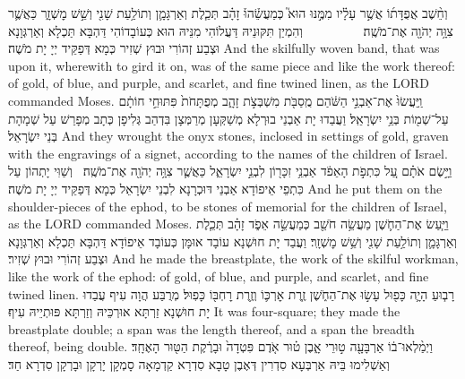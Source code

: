 {%
{וְחֵ֨שֶׁב אֲפֻדָּת֜וֹ אֲשֶׁ֣ר עָלָ֗יו מִמֶּ֣נּוּ הוּא֮ כְּמַעֲשֵׂ֒הוּ֒ זָהָ֗ב תְּכֵ֧לֶת וְאַרְגָּמָ֛ן וְתוֹלַ֥עַת שָׁנִ֖י וְשֵׁ֣שׁ מׇשְׁזָ֑ר כַּאֲשֶׁ֛ר צִוָּ֥ה יְהֹוָ֖ה אֶת־מֹשֶֽׁה׃ \setuma         }
{וְהִמְיַן תִּקּוּנֵיהּ דַּעֲלוֹהִי מִנֵּיהּ הוּא כְּעוֹבָדוֹהִי דַּהְבָּא תַּכְלָא וְאַרְגְּוָנָא וּצְבַע זְהוֹרִי וּבוּץ שְׁזִיר כְּמָא דְּפַקֵּיד יְיָ יָת מֹשֶׁה׃}
{And the skilfully woven band, that was upon it, wherewith to gird it on, was of the same piece and like the work thereof: of gold, of blue, and purple, and scarlet, and fine twined linen, as the LORD commanded Moses.}{}
{וַֽיַּעֲשׂוּ֙ אֶת־אַבְנֵ֣י הַשֹּׁ֔הַם מֻֽסַבֹּ֖ת מִשְׁבְּצֹ֣ת זָהָ֑ב מְפֻתָּחֹת֙ פִּתּוּחֵ֣י חוֹתָ֔ם עַל־שְׁמ֖וֹת בְּנֵ֥י יִשְׂרָאֵֽל׃}
{וַעֲבַדוּ יָת אַבְנֵי בוּרְלָא מְשַׁקְּעָן מְרַמְּצָן בִּדְהַב גְּלִיפָן כְּתָב מְפָרַשׁ עַל שְׁמָהָת בְּנֵי יִשְׂרָאֵל׃}
{And they wrought the onyx stones, inclosed in settings of gold, graven with the engravings of a signet, according to the names of the children of Israel.}{}
{וַיָּ֣שֶׂם אֹתָ֗ם עַ֚ל כִּתְפֹ֣ת הָאֵפֹ֔ד אַבְנֵ֥י זִכָּר֖וֹן לִבְנֵ֣י יִשְׂרָאֵ֑ל כַּאֲשֶׁ֛ר צִוָּ֥ה יְהֹוָ֖ה אֶת־מֹשֶֽׁה׃ \petucha }
{וְשַׁוִּי יָתְהוֹן עַל כִּתְפֵי אֵיפוֹדָא אַבְנֵי דּוּכְרָנָא לִבְנֵי יִשְׂרָאֵל כְּמָא דְּפַקֵּיד יְיָ יָת מֹשֶׁה׃}
{And he put them on the shoulder-pieces of the ephod, to be stones of memorial for the children of Israel, as the LORD commanded Moses.}{}
{וַיַּ֧עַשׂ אֶת־הַחֹ֛שֶׁן מַעֲשֵׂ֥ה חֹשֵׁ֖ב כְּמַעֲשֵׂ֣ה אֵפֹ֑ד זָהָ֗ב תְּכֵ֧לֶת וְאַרְגָּמָ֛ן וְתוֹלַ֥עַת שָׁנִ֖י וְשֵׁ֥שׁ מׇשְׁזָֽר׃}
{וַעֲבַד יָת חוּשְׁנָא עוֹבָד אוּמָּן כְּעוֹבָד אֵיפוֹדָא דַּהְבָּא תַּכְלָא וְאַרְגְּוָנָא וּצְבַע זְהוֹרִי וּבוּץ שְׁזִיר׃}
{And he made the breastplate, the work of the skilful workman, like the work of the ephod: of gold, of blue, and purple, and scarlet, and fine twined linen.}{}
{רָב֧וּעַ הָיָ֛ה כָּפ֖וּל עָשׂ֣וּ אֶת־הַחֹ֑שֶׁן זֶ֧רֶת אׇרְכּ֛וֹ וְזֶ֥רֶת רׇחְבּ֖וֹ כָּפֽוּל׃}
{מְרֻבַּע הֲוָה עִיף עֲבַדוּ יָת חוּשְׁנָא זַרְתָּא אוּרְכֵּיהּ וְזַרְתָּא פּוּתְיֵיהּ עִיף׃}
{It was four-square; they made the breastplate double; a span was the length thereof, and a span the breadth thereof, being double.}{}
{וַיְמַ֨לְאוּ־ב֔וֹ אַרְבָּעָ֖ה ט֣וּרֵי אָ֑בֶן ט֗וּר אֹ֤דֶם פִּטְדָה֙ וּבָרֶ֔קֶת הַטּ֖וּר הָאֶחָֽד׃}
{וְאַשְׁלִימוּ בֵּיהּ אַרְבְּעָא סִדְרִין דְּאֶבֶן טָבָא סִדְרָא קַדְמָאָה סָמְקָן יָרְקָן וּבָרְקָן סִדְרָא חַד׃}
}
